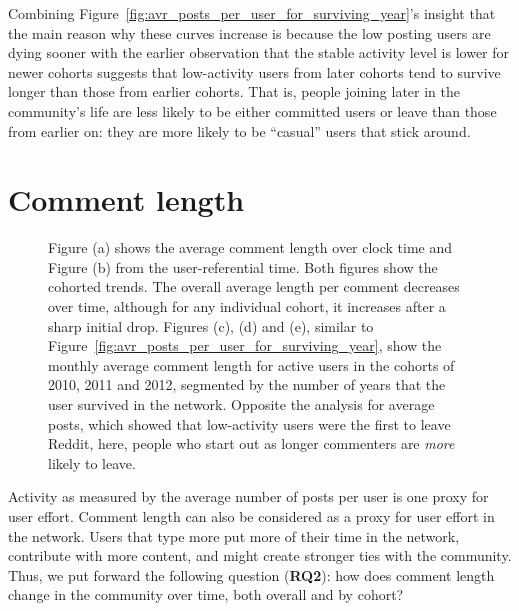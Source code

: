 Combining Figure~\ref{fig:avr_posts_per_user_for_surviving_year}'s insight that the main reason why these curves increase is because the low posting users are dying sooner with the earlier observation that the stable activity level is lower for newer cohorts suggests that low-activity users from later cohorts tend to survive longer than those from earlier cohorts.  That is, people joining later in the community's life are less likely to be either committed users or leave than those from earlier on: they are more likely to be ``casual'' users that stick around.

\vspace{7pt} 
\section{Comment length}

\begin{figure}[!tb]
\centering
{}
\caption{Figure (a) shows the average comment length over clock time and Figure (b) from the user-referential time. Both figures show the cohorted trends.  The overall average length per comment decreases over time, although for any individual cohort, it increases after a sharp initial drop. Figures (c), (d) and (e), similar to Figure~\ref{fig:avr_posts_per_user_for_surviving_year}, show the monthly average comment length for active users in the cohorts of 2010, 2011 and 2012, segmented by the number of years that the user survived in the network.  Opposite the analysis for average posts, which showed that low-activity users were the first to leave Reddit, here, people who start out as longer commenters are \textit{more} likely to leave.}
\label{fig:comment_length}
\end{figure}

Activity as measured by the average number of posts per user is one proxy for user effort.  Comment length can also be considered as a proxy for user effort in the network.  Users that type more put more of their time in the network, contribute with more content, and might create stronger ties with the community. Thus, we put forward the following question (\textbf{RQ2}): how does comment length change in the community over time, both overall and by cohort?


